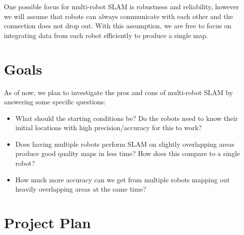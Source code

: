 \documentclass[11pt]{article}
\begin{document}
One possible focus for multi-robot SLAM is robustness and reliability, however we will assume that robots can always communicate with each other and the connection does not drop out. With this assumption, we are free to focus on integrating data from each robot efficiently to produce a single map.

\section{Goals}

As of now, we plan to investigate the pros and cons of multi-robot SLAM by answering some specific questions:

\begin{itemize}
    \item What should the starting conditions be? Do the robots need to know their initial locations with high precision/accuracy for this to work?

    \item Does having multiple robots perform SLAM on slightly overlapping areas produce good quality maps in less time? How does this compare to a single robot?

    \item How much more accuracy can we get from multiple robots mapping out heavily overlapping areas at the same time?

\end{itemize}

\section*{Project Plan}
\end{document}
